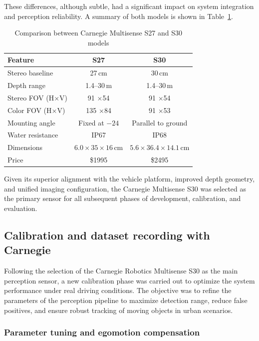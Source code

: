 These differences, although subtle, had a significant impact on system integration 
and perception reliability. A summary of both models is shown in 
Table~\ref{tab:s27_s30_comparison}.

\begin{table}[H]
  \centering
  \begin{tabular}{lcc}
    \toprule
    \textbf{Feature} & \textbf{S27} & \textbf{S30} \\
    \midrule
    Stereo baseline & 27\,cm & 30\,cm \\
    Depth range & 1.4--30\,m & 1.4--30\,m \\
    Stereo FOV (H$\times$V) & 91 $\times$54  & 91 $\times$54  \\
    Color FOV (H$\times$V) & 135 $\times$84  & 91 $\times$53  \\
    Mounting angle & Fixed at $-24$  & Parallel to ground \\
    Water resistance & IP67 & IP68 \\
    Dimensions & $6.0 \times 35 \times 16$\,cm & $5.6 \times 36.4 \times 14.1$\,cm \\
    Price & \$1995 & \$2495 \\
    \bottomrule
  \end{tabular}
  \caption{Comparison between Carnegie Multisense S27 and S30 models}
  \label{tab:s27_s30_comparison}
\end{table}

Given its superior alignment with the vehicle platform, improved depth geometry, 
and unified imaging configuration, the Carnegie Multisense S30 was selected as 
the primary sensor for all subsequent phases of development, calibration, and 
evaluation.

\subsection{Calibration and dataset recording with Carnegie}\label{sec:CarnegieDatasets}

Following the selection of the Carnegie Robotics Multisense S30 as the 
main perception sensor, a new calibration phase was carried out to 
optimize the system performance under real driving conditions. The 
objective was to refine the parameters of the perception pipeline to 
maximize detection range, reduce false positives, and ensure robust 
tracking of moving objects in urban scenarios.

\subsubsection{Parameter tuning and egomotion compensation}

